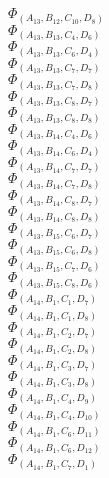 \documentclass[14pt]{article}
\begin{document}
    $\Phi_{({A}_{13}, {B}_{12}, {C}_{10}, {D}_{8})}$ \\ 
    $\Phi_{({A}_{13}, {B}_{13}, {C}_{4}, {D}_{6})}$ \\ 
    $\Phi_{({A}_{13}, {B}_{13}, {C}_{6}, {D}_{4})}$ \\ 
    $\Phi_{({A}_{13}, {B}_{13}, {C}_{7}, {D}_{7})}$ \\ 
    $\Phi_{({A}_{13}, {B}_{13}, {C}_{7}, {D}_{8})}$ \\ 
    $\Phi_{({A}_{13}, {B}_{13}, {C}_{8}, {D}_{7})}$ \\ 
    $\Phi_{({A}_{13}, {B}_{13}, {C}_{8}, {D}_{8})}$ \\ 
    $\Phi_{({A}_{13}, {B}_{14}, {C}_{4}, {D}_{6})}$ \\ 
    $\Phi_{({A}_{13}, {B}_{14}, {C}_{6}, {D}_{4})}$ \\ 
    $\Phi_{({A}_{13}, {B}_{14}, {C}_{7}, {D}_{7})}$ \\ 
    $\Phi_{({A}_{13}, {B}_{14}, {C}_{7}, {D}_{8})}$ \\ 
    $\Phi_{({A}_{13}, {B}_{14}, {C}_{8}, {D}_{7})}$ \\ 
    $\Phi_{({A}_{13}, {B}_{14}, {C}_{8}, {D}_{8})}$ \\ 
    $\Phi_{({A}_{13}, {B}_{15}, {C}_{6}, {D}_{7})}$ \\ 
    $\Phi_{({A}_{13}, {B}_{15}, {C}_{6}, {D}_{8})}$ \\ 
    $\Phi_{({A}_{13}, {B}_{15}, {C}_{7}, {D}_{6})}$ \\ 
    $\Phi_{({A}_{13}, {B}_{15}, {C}_{8}, {D}_{6})}$ \\ 
    $\Phi_{({A}_{14}, {B}_{1}, {C}_{1}, {D}_{7})}$ \\ 
    $\Phi_{({A}_{14}, {B}_{1}, {C}_{1}, {D}_{8})}$ \\ 
    $\Phi_{({A}_{14}, {B}_{1}, {C}_{2}, {D}_{7})}$ \\ 
    $\Phi_{({A}_{14}, {B}_{1}, {C}_{2}, {D}_{8})}$ \\ 
    $\Phi_{({A}_{14}, {B}_{1}, {C}_{3}, {D}_{7})}$ \\ 
    $\Phi_{({A}_{14}, {B}_{1}, {C}_{3}, {D}_{8})}$ \\ 
    $\Phi_{({A}_{14}, {B}_{1}, {C}_{4}, {D}_{9})}$ \\ 
    $\Phi_{({A}_{14}, {B}_{1}, {C}_{4}, {D}_{10})}$ \\ 
    $\Phi_{({A}_{14}, {B}_{1}, {C}_{6}, {D}_{11})}$ \\ 
    $\Phi_{({A}_{14}, {B}_{1}, {C}_{6}, {D}_{12})}$ \\ 
    $\Phi_{({A}_{14}, {B}_{1}, {C}_{7}, {D}_{1})}$ \\ 
\end{document}
